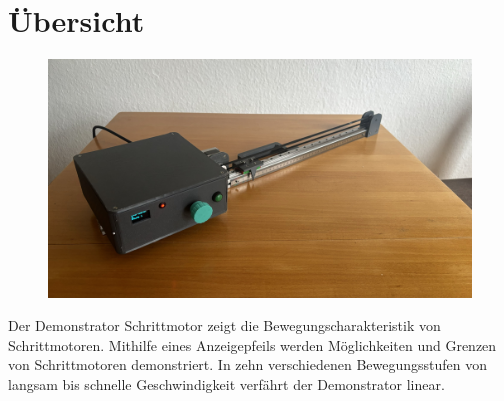 %
%



\chapter{Übersicht}

\begin{figure}[htb]
	\begin{center}
		
			\includegraphics[width=\textwidth]{Images/DemonstratorDrauf.jpg}
	\end{center}
\end{figure}

Der Demonstrator Schrittmotor zeigt die Bewegungscharakteristik von Schrittmotoren. Mithilfe eines Anzeigepfeils werden Möglichkeiten und Grenzen von Schrittmotoren demonstriert. In zehn verschiedenen Bewegungsstufen von langsam bis schnelle Geschwindigkeit verfährt der Demonstrator linear. 

